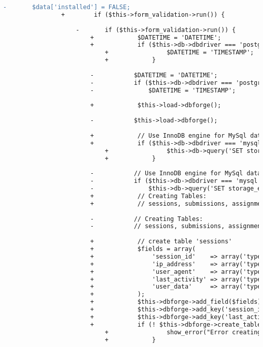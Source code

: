 \begin{lstlisting}[language=diff, caption=Perubahan pada kode Install.php]
				-		$data['installed'] = FALSE;
				+        if ($this->form_validation->run()) {
					
					-		if ($this->form_validation->run()) {
						+            $DATETIME = 'DATETIME';
						+            if ($this->db->dbdriver === 'postgre') {
							+                $DATETIME = 'TIMESTAMP';
							+            }
						
						-			$DATETIME = 'DATETIME';
						-			if ($this->db->dbdriver === 'postgre')
						-				$DATETIME = 'TIMESTAMP';
						
						+            $this->load->dbforge();
						
						-			$this->load->dbforge();
						
						+            // Use InnoDB engine for MySql database
						+            if ($this->db->dbdriver === 'mysql' || $this->db->dbdriver === 'mysqli') {
							+                $this->db->query('SET storage_engine=InnoDB;');
							+            }
						
						-			// Use InnoDB engine for MySql database
						-			if ($this->db->dbdriver === 'mysql' || $this->db->dbdriver === 'mysqli')
						-				$this->db->query('SET storage_engine=InnoDB;');
						+            // Creating Tables:
						+            // sessions, submissions, assignments, notifications, problems, queue, scoreboard, settings, users
						
						-			// Creating Tables:
						-			// sessions, submissions, assignments, notifications, problems, queue, scoreboard, settings, users
						
						+            // create table 'sessions'
						+            $fields = array(
						+                'session_id'    => array('type' => 'VARCHAR', 'constraint' => 40, 'default' => '0'),
						+                'ip_address'    => array('type' => 'VARCHAR', 'constraint' => 45, 'default' => '0'),
						+                'user_agent'    => array('type' => 'VARCHAR', 'constraint' => 120),
						+                'last_activity' => array('type' => 'INT', 'constraint' => 10, 'unsigned' => true, 'default' => '0'),
						+                'user_data'     => array('type' => 'TEXT'),
						+            );
						+            $this->dbforge->add_field($fields);
						+            $this->dbforge->add_key('session_id', true); // PRIMARY KEY
						+            $this->dbforge->add_key('last_activity');
						+            if (! $this->dbforge->create_table('sessions', true)) {
							+                show_error("Error creating database table ".$this->db->dbprefix('sessions'));
							+            }
						

\end{lstlisting}
